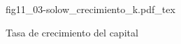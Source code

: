 \begin{figure}[h]
\centering
\def\svgwidth{0.5\textwidth}
{fig11_03-solow_crecimiento_k.pdf_tex}
\caption{Tasa de crecimiento del capital}
\label{fig11_03-solow_crecimiento_k}
\end{figure}